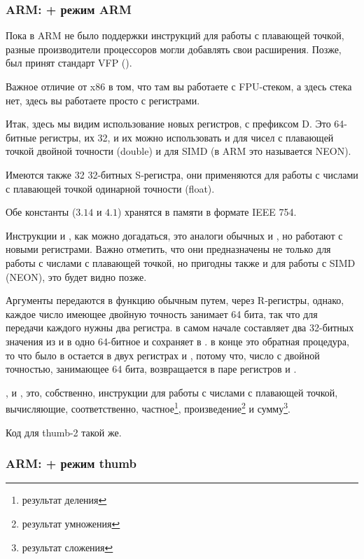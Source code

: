 ﻿\subsubsection{ARM: \OptimizingXcode + режим ARM}

Пока в ARM не было поддержки инструкций для работы с плавающей точкой, разные производители процессоров
могли добавлять свои расширения. Позже, был принят стандарт VFP ().

Важное отличие от x86 в том, что там вы работаете с FPU-стеком, а здесь стека нет, 
здесь вы работаете просто с регистрами.



Итак, здесь мы видим использование новых регистров, с префиксом D. 
Это 64-битные регистры, их 32, и их можно
использовать и для чисел с плавающей точкой двойной точности (double) и для SIMD (в ARM это называется NEON).

Имеются также 32 32-битных S-регистра, они применяются для работы с числами с плавающей точкой одинарной точности
(float).

Обе константы ($3.14$ и $4.1$) хранятся в памяти в формате IEEE 754.

Инструкции  и , как можно догадаться, это аналоги обычных  и \MOV, 
но работают с новыми регистрами.
Важно отметить, что они предназначены не только для работы с числами с плавающей точкой, но пригодны также и для
работы с SIMD (NEON), это будет видно позже.

Аргументы передаются в функцию обычным путем, через R-регистры, однако, каждое число имеющее двойную точность
занимает 64 бита, так что для передачи каждого нужны два регистра. 
 в самом начале
составляет два 32-битных значения из  и  в одно 64-битное и сохраняет в . 
 в конце это обратная процедура, то что было в  
остается в двух регистрах  и ,
потому что, число с двойной точностью, занимающее 64 бита, возвращается в паре регистров  и .

,  и , это, собственно, инструкции для работы с числами с плавающей точкой, 
вычисляющие, соответственно, частное\footnote{результат деления}, 
произведение\footnote{результат умножения} и сумму\footnote{результат сложения}.

Код для thumb-2 такой же.

\subsubsection{ARM: \OptimizingKeil + режим thumb}


